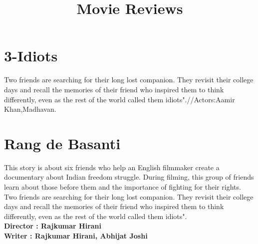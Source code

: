 \documentclass{article}
\title{Movie Reviews}
\begin{document}
	\maketitle
	\section{3-Idiots}
	\large{Two friends are searching for their long lost companion. They revisit their college days and recall the memories of their friend who inspired them to think differently, even as the rest of the world called them idiots".//Actors:Aamir Khan,Madhavan.}
	\section{Rang de Basanti}
	\large{This story is about six friends who help an English filmmaker create a documentary about Indian freedom struggle. During filming, this group of friends learn about those before them and the importance of fighting for their rights.}
	\large{Two friends are searching for their long lost companion. They revisit their college days and recall the memories of their friend who inspired them to think differently, even as the rest of the world called them idiots".}
\\
\textbf{Director : Rajkumar Hirani}
\\
\textbf{Writer : Rajkumar Hirani, Abhijat Joshi} %
\end{document}
